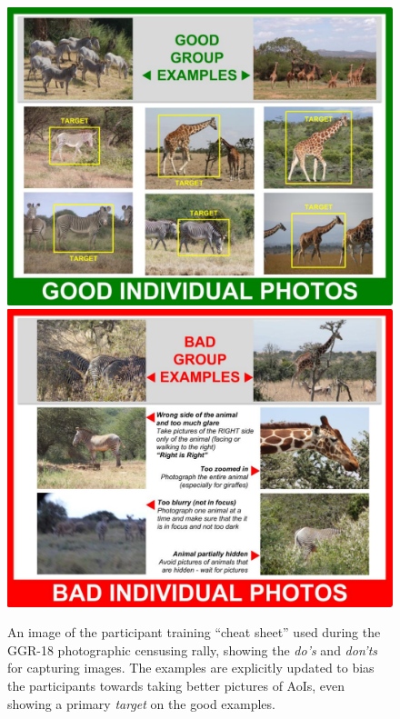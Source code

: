 \begin{figure}[!t]
    \begin{center}
        \includegraphics[width=0.72\linewidth]{resources/training-good-new.pdf} \\
        \vspace{3mm}
        \includegraphics[width=0.72\linewidth]{resources/training-bad-new.pdf}
    \end{center}
    \caption{An image of the participant training ``cheat sheet'' used during the GGR-18 photographic censusing rally, showing the \textit{do's} and \textit{don'ts} for capturing images.  The examples are explicitly updated to bias the participants towards taking better pictures of AoIs, even showing a primary \textit{target} on the good examples.}
    \label{fig:cheatsheet}
\end{figure}

